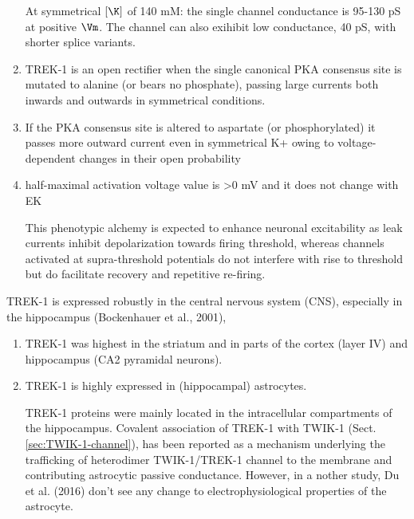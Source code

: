 \begin{enumerate}
  At symmetrical $[\K]$ of 140 mM: the single channel conductance is 95-130 pS
  at positive $\Vm$. The channel can also exihibit low conductance, 40 pS,
  with shorter splice variants.
  
  \item  TREK-1 is an open rectifier when the single canonical PKA consensus
site is mutated to alanine (or bears no phosphate), passing
large currents both inwards and outwards in symmetrical
conditions.
  
  \item If the PKA consensus site is altered to aspartate (or phosphorylated)
  it passes more outward current even in symmetrical K+ owing to
  voltage-dependent changes in their open probability 
  
  \item half-maximal activation voltage value is >0 mV and it does not change
  with EK
  
This phenotypic alchemy is expected to enhance neuronal excitability as leak
currents inhibit depolarization towards firing threshold, whereas channels
activated at supra-threshold potentials do not interfere with rise to threshold
but do facilitate recovery and repetitive re-firing.


\end{enumerate}


TREK-1 is expressed robustly in the central nervous system (CNS), especially in
the hippocampus (Bockenhauer et al., 2001),
\begin{enumerate}

  \item TREK-1 was highest in the striatum and in parts of the cortex (layer IV)
  and hippocampus (CA2 pyramidal neurons). 

  \item TREK-1 is highly expressed in (hippocampal) astrocytes.
  
  TREK-1 proteins were mainly located in the intracellular compartments of the
  hippocampus. Covalent association of TREK-1 with TWIK-1
  (Sect.\ref{sec:TWIK-1-channel}), has been reported as a mechanism underlying
  the  trafficking of heterodimer TWIK-1/TREK-1 channel to the membrane and 
  contributing astrocytic passive conductance. However, in a nother study, Du et
  al. (2016) don't see any change to electrophysiological properties of the
  astrocyte.


\end{enumerate}


